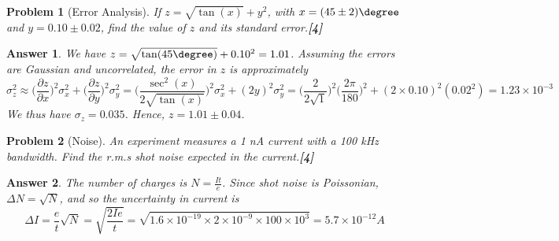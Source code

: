 \documentclass[a4paper]{article}
\newtheorem{ans}{Answer}[subsection]
\theoremstyle{new}
\newtheorem{qns}{Problem}[subsection]
\begin{document}
\begin{qns}[Error Analysis]
If $z=\sqrt{\tan(x)}+y^2$, with $x=(45\pm 2)\degree$ and $y=0.10\pm 0.02$, find the value of $z$ and its standard error.\hfill\textbf{[4]}
\end{qns}
\begin{ans}
We have $z=\sqrt{\tan(45\degree)}+0.10^2=1.01$. Assuming the errors are Gaussian and uncorrelated, the error in $z$ is approximately
$$\sigma_z^2\approx\bigg(\frac{\partial z}{\partial x}\bigg)^2\sigma_x^2+\bigg(\frac{\partial z}{\partial y}\bigg)^2\sigma_y^2=\bigg(\frac{\sec^2(x)}{2\sqrt{\tan(x)}}\bigg)^2\sigma_x^2+(2y)^2\sigma_y^2=\bigg(\frac{2}{2\sqrt{1}}\bigg)^2\bigg(\frac{2\pi}{180}\bigg)^2+(2\times0.10)^2(0.02^2)=1.23\times10^{-3}$$
We thus have $\sigma_z=0.035$. Hence, $z=1.01\pm0.04$.
\end{ans}
\begin{qns}[Noise]
An experiment measures a 1 nA current with a 100 kHz bandwidth. Find the r.m.s shot noise expected in the current.\hfill\textbf{[4]}
\end{qns}
\begin{ans}
The number of charges is $N=\frac{It}{e}$. Since shot noise is Poissonian, $\Delta N=\sqrt{N}$, and so the uncertainty in current is 
$$\Delta I=\frac{e}{t}\sqrt{N}=\sqrt{\frac{2Ie}{t}}=\sqrt{1.6\times10^{-19}\times2\times10^{-9}\times100\times10^3}=5.7\times10^{-12}A$$
\end{ans}
\newpage
\end{document}
